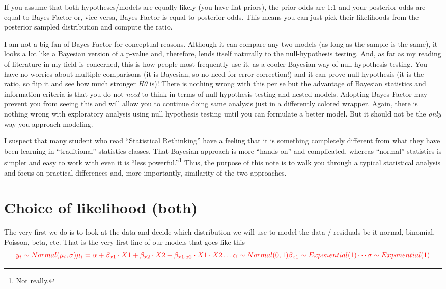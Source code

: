 \documentclass[
]{book}
\begin{document}
If you assume that both hypotheses/models are equally likely (you have flat priors), the prior odds are 1:1 and your posterior odds are equal to Bayes Factor or, vice versa, Bayes Factor is equal to posterior odds. This means you can just pick their likelihoods from the posterior sampled distribution and compute the ratio.

I am not a big fan of Bayes Factor for conceptual reasons. Although it can compare any two models (as long as the sample is the same), it looks a lot like a Bayesian version of a p-value and, therefore, lends itself naturally to the null-hypothesis testing. And, as far as my reading of literature in my field is concerned, this is how people most frequently use it, as a cooler Bayesian way of null-hypothesis testing. You have no worries about multiple comparisons (it is Bayesian, so no need for error correction!) and it can prove null hypothesis (it is the ratio, so flip it and see how much stronger \emph{H0} is)! There is nothing wrong with this per se but the advantage of Bayesian statistics and information criteria is that you do not \emph{need} to think in terms of null hypothesis testing and nested models. Adopting Bayes Factor may prevent you from seeing this and will allow you to continue doing same analysis just in a differently colored wrapper. Again, there is nothing wrong with exploratory analysis using null hypothesis testing until you can formulate a better model. But it should not be the \emph{only} way you approach modeling.

I suspect that many student who read ``Statistical Rethinking'' have a feeling that it is something completely different from what they have been learning in ``traditional'' statistics classes. That Bayesian approach is more ``hands-on'' and complicated, whereas ``normal'' statistics is simpler and easy to work with even it is ``less powerful.''\footnote{Not really.} Thus, the purpose of this note is to walk you through a typical statistical analysis and focus on practical differences and, more importantly, similarity of the two approaches.

\hypertarget{choice-of-likelihood-both}{%
\section{Choice of likelihood (both)}\label{choice-of-likelihood-both}}

The very first we do is to look at the data and decide which distribution we will use to model the data / residuals be it normal, binomial, Poisson, beta, etc. That is the very first line of our models that goes like this
\[
\color{red}{y_i \sim Normal(\mu_i, \sigma)} \\
\mu_i = \alpha + \beta_{x1} \cdot X1 + \beta_{x2} \cdot X2 + \beta_{x1\cdot x2} \cdot X1 \cdot X2 \dotso \\
\alpha \sim Normal(0, 1) \\
\beta_{x1} \sim Exponential(1) \\
\cdots \\
\sigma \sim Exponential(1)
\]
\end{document}
